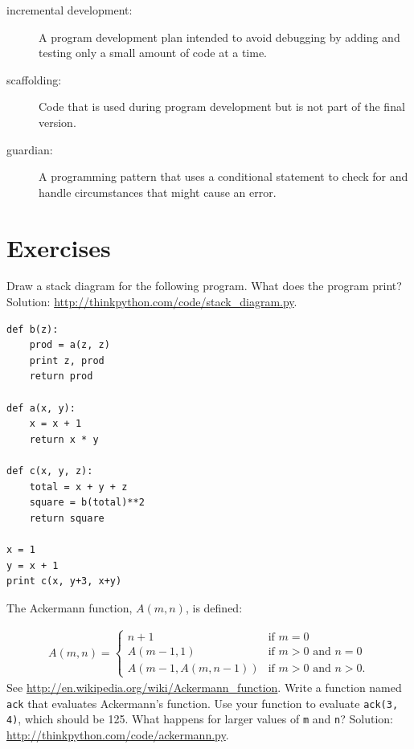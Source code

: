 \documentclass[10pt]{book}
\begin{document}
\begin{CJK}{UTF8}{gbsn}
\begin{description}
\item[incremental development:]  A program development plan intended to
avoid debugging by adding and testing only
a small amount of code at a time.

\item[scaffolding:]  Code that is used during program development but is
not part of the final version.

\item[guardian:]  A programming pattern that uses a conditional
statement to check for and handle circumstances that
might cause an error.

\end{description}


\section{Exercises}

\begin{exercise}

Draw a stack diagram for the following program.  What does the program print?
Solution: \url{http://thinkpython.com/code/stack_diagram.py}.

\begin{verbatim}
def b(z):
    prod = a(z, z)
    print z, prod
    return prod

def a(x, y):
    x = x + 1
    return x * y

def c(x, y, z):
    total = x + y + z
    square = b(total)**2
    return square

x = 1
y = x + 1
print c(x, y+3, x+y)
\end{verbatim}

\end{exercise}


\begin{exercise}
\label{ackermann}

The Ackermann function, $A(m, n)$, is defined:

\begin{eqnarray*}
A(m, n) = \begin{cases} 
              n+1 & \mbox{if } m = 0 \\ 
        A(m-1, 1) & \mbox{if } m > 0 \mbox{ and } n = 0 \\ 
A(m-1, A(m, n-1)) & \mbox{if } m > 0 \mbox{ and } n > 0.
\end{cases} 
\end{eqnarray*}
%
See \url{http://en.wikipedia.org/wiki/Ackermann_function}.
Write a function named {\tt ack} that evaluates Ackermann's function.
Use your function to evaluate {\tt ack(3, 4)}, which should be 125.
What happens for larger values of {\tt m} and {\tt n}?
Solution: \url{http://thinkpython.com/code/ackermann.py}.


\end{exercise}
\end{CJK}
\end{document}
